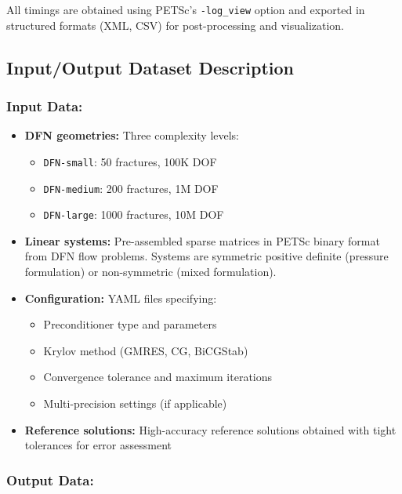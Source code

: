 All timings are obtained using PETSc's \verb+-log_view+ option and exported in structured formats (XML, CSV) for post-processing and visualization.



\subsection{Input/Output Dataset Description}


\subsubsection{Input Data:}
\begin{itemize}
\item \textbf{DFN geometries:} Three complexity levels:
  \begin{itemize}
  \item \texttt{DFN-small}: 50 fractures, 100K DOF
  \item \texttt{DFN-medium}: 200 fractures, 1M DOF  
  \item \texttt{DFN-large}: 1000 fractures, 10M DOF
  \end{itemize}
  
\item \textbf{Linear systems:} Pre-assembled sparse matrices in PETSc binary format from DFN flow problems. Systems are symmetric positive definite (pressure formulation) or non-symmetric (mixed formulation).

\item \textbf{Configuration:} YAML files specifying:
  \begin{itemize}
  \item Preconditioner type and parameters
  \item Krylov method (GMRES, CG, BiCGStab)
  \item Convergence tolerance and maximum iterations
  \item Multi-precision settings (if applicable)
  \end{itemize}

\item \textbf{Reference solutions:} High-accuracy reference solutions obtained with tight tolerances for error assessment
\end{itemize}

\subsubsection{Output Data:}

